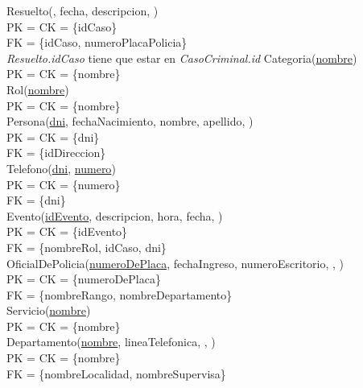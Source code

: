 \documentclass[10pt,a4paper]{article}
\begin{document}
\newline
Resuelto(, fecha, descripcion, )\\ 
	PK = CK = \{idCaso\}\\ 
	FK = \{idCaso, numeroPlacaPolicia\}\\ 	
\newline
\textit{Resuelto.idCaso} tiene que estar en \textit{CasoCriminal.id}
\newline
\newline
Categoria(\underline{nombre})\\ 
	PK = CK = \{nombre\}\\ 
\newline
Rol(\underline{nombre})\\ 
	PK = CK = \{nombre\}\\ 
\newline
Persona(\underline{dni}, fechaNacimiento, nombre, apellido, )\\ 
	PK = CK = \{dni\}\\ 
	FK = \{idDireccion\}\\ 
\newline
Telefono(\underline{\underline{dni}}, \underline{numero})\\ 
	PK = CK = \{numero\}\\
	FK = \{dni\}\\ 
\newline
Evento(\underline{idEvento}, descripcion, hora, fecha, )\\ 
	PK = CK  = \{idEvento\}\\ 
	FK = \{nombreRol, idCaso, dni\}\\
\newline
OficialDePolicia(\underline{numeroDePlaca}, fechaIngreso, numeroEscritorio, , )\\
	PK = CK = \{numeroDePlaca\}\\ 
	FK = \{nombreRango, nombreDepartamento\}\\
\newline
Servicio(\underline{nombre})\\ 
	PK = CK = \{nombre\}\\ 
\newline
Departamento(\underline{nombre}, lineaTelefonica, , )\\ 
	PK = CK = \{nombre\}\\ 
	FK = \{nombreLocalidad, nombreSupervisa\}\\
\end{document}
